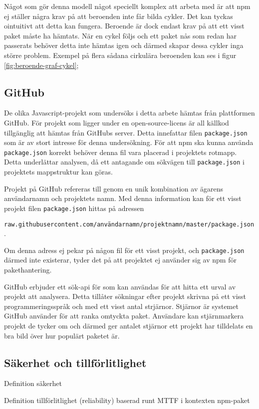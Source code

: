 Något som gör denna modell något speciellt komplex att arbeta med är att npm ej ställer några krav på att beroenden inte får bilda cykler. Det kan tyckas ointuitivt att detta kan fungera. Beroende är dock endast krav på att ett visst paket måste ha hämtats. När en cykel följs och ett paket nås som redan har passerats behöver detta inte hämtas igen och därmed skapar dessa cykler inga större problem. Exempel på flera sådana cirkulära beroenden kan ses i figur \ref{fig:beroende-graf-cykel};

\subsection{GitHub}
De olika Javascript-projekt som undersöks i detta arbete hämtas från plattformen GitHub. För projekt som ligger under en open-source-licens är all källkod tillgänglig att hämtas från GitHubs server. Detta innefattar filen \texttt{package.json} som är av stort intresse för denna undersökning. För att npm ska kunna använda \texttt{package.json} korrekt behöver denna fil vara placerad i projektets rotmapp. Detta underlättar analysen, då ett antagande om sökvägen till \texttt{package.json} i projektets mappstruktur kan göras.

Projekt på GitHub refereras till genom en unik kombination av ägarens användarnamn och projektets namn. Med denna information kan för ett visst projekt filen \texttt{package.json} hittas på adressen

\texttt{raw.githubusercontent.com/användarnamn/projektnamn/master/package.json}.

Om denna adress ej pekar på någon fil för ett visst projekt, och \texttt{package.json} därmed inte existerar, tyder det på att projektet ej använder sig av npm för pakethantering.

GitHub erbjuder ett sök-api för som kan användas för att hitta ett urval av projekt att analysera.\cite{github-api} Detta tillåter sökningar efter projekt skrivna på ett visst programmeringsspråk och med ett visst antal strjärnor. Stjärnor är systemet GitHub använder för att ranka omtyckta paket. Användare kan stjärnmarkera projekt de tycker om och därmed ger antalet stjärnor ett projekt har tilldelats en bra bild över hur populärt paketet är.

\subsection{Säkerhet och tillförlitlighet}
Definition säkerhet

Definition tillförlitlighet (reliability) baserad runt MTTF i kontexten npm-paket
